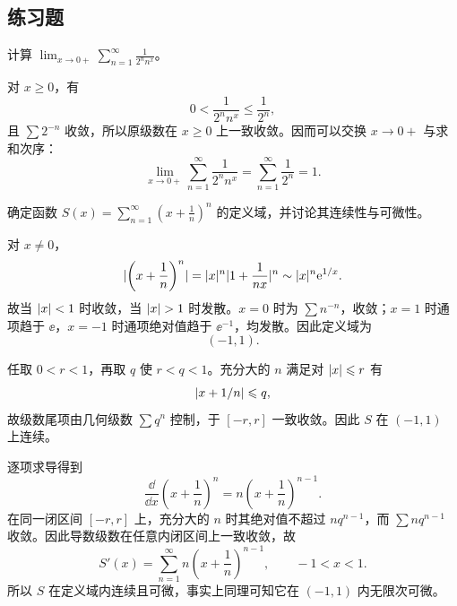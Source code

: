 \subsection{练习题}

\begin{xexercise}[1]
计算 $\displaystyle\lim_{x\to0+}\sum_{n=1}^{\infty}\frac1{2^n n^x}$。
\end{xexercise}
\begin{xsolution}
对 $x\geqslant0$，有
\[
  0<\frac1{2^n n^x}\leqslant\frac1{2^n},
\]
且 $\sum 2^{-n}$ 收敛，所以原级数在 $x\geqslant0$ 上一致收敛。因而可以交换 $x\to0+$ 与求和次序：
\[
  \lim_{x\to0+}\sum_{n=1}^{\infty}\frac1{2^n n^x}
  =\sum_{n=1}^{\infty}\frac1{2^n}=1.
\]
\end{xsolution}


\begin{xexercise}[2]
确定函数 $\displaystyle S(x)=\sum_{n=1}^{\infty}\left(x+\frac1n\right)^n$ 的定义域，并讨论其连续性与可微性。
\end{xexercise}
\begin{xsolution}
对 $x\ne0$，
\[
  \lvert\left(x+\frac1n\right)^n\rvert
  =\lvert x\rvert^n\lvert1+\frac1{nx}\rvert^n
  \sim\lvert x\rvert^n\mathrm{e}^{1/x}.
\]
故当 $\lvert x\rvert<1$ 时收敛，当 $\lvert x\rvert>1$ 时发散。$x=0$ 时为 $\sum n^{-n}$，收敛；$x=1$ 时通项趋于 $\ee$，$x=-1$ 时通项绝对值趋于 $\ee^{-1}$，均发散。因此定义域为
\[
  (-1,1).
\]

任取 $0<r<1$，再取 $q$ 使 $r<q<1$。充分大的 $n$ 满足对 $\lvert x\rvert\leqslant r$ 有
\[
  \lvert x+1/n\rvert\leqslant q,
\]
故级数尾项由几何级数 $\sum q^n$ 控制，于 $[-r,r]$ 一致收敛。因此 $S$ 在 $(-1,1)$ 上连续。

逐项求导得到
\[
  \frac{\dd}{\dd x}\left(x+\frac1n\right)^n
  =n\left(x+\frac1n\right)^{n-1}.
\]
在同一闭区间 $[-r,r]$ 上，充分大的 $n$ 时其绝对值不超过 $nq^{n-1}$，而 $\sum nq^{n-1}$ 收敛。因此导数级数在任意内闭区间上一致收敛，故
\[
  S'(x)=\sum_{n=1}^{\infty}n\left(x+\frac1n\right)^{n-1},
  \qquad -1<x<1.
\]
所以 $S$ 在定义域内连续且可微，事实上同理可知它在 $(-1,1)$ 内无限次可微。
\end{xsolution}


